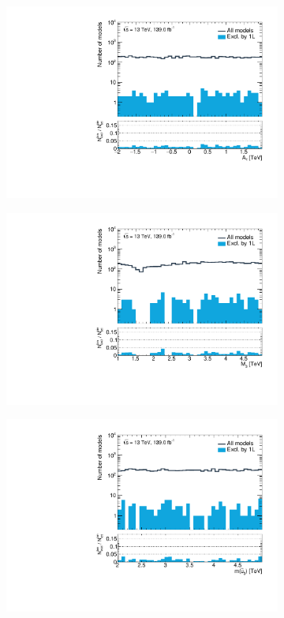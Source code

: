 \begin{figure}
\begin{subfigure}[b]{0.4\linewidth}
		\centering\includegraphics[width=\textwidth]{1D/Atau}
	\end{subfigure}
	\begin{subfigure}[b]{0.4\linewidth}
		\centering\includegraphics[width=\textwidth]{1D/M3}
	\end{subfigure}
	\begin{subfigure}[b]{0.4\linewidth}
		\centering\includegraphics[width=\textwidth]{1D/mtR}

\end{subfigure}
\end{figure}

